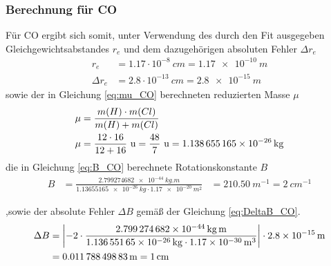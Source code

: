 \subsubsection*{Berechnung für CO}
Für CO ergibt sich somit, unter Verwendung des durch den Fit ausgegeben Gleichgewichtsabstandes $r_e$ und dem dazugehörigen absoluten Fehler $\Delta r_e$
\begin{align}
\label{eq:r_CO}
r_e &= 1.17 \cdot 10^{-8} ~\si{cm}=\SI[mode=math]{1.17e-10}{m}
\\
\Delta r_e &= 2.8 \cdot 10^{-13} ~\si{cm}=\SI[mode=math]{2.8e-15}{m}
\end{align}
 sowie der in Gleichung \ref{eq:mu_CO} berechneten reduzierten Masse $\mu$
\begin{align}
\mu&= \frac{m(H)\cdot m(Cl)}{m(H)+m(Cl)}\notag\\
\mu&= \frac{12\cdot16}{12+16} ~\si{u}=\frac{48}{7}~\si{u}=\SI[mode=math]{1.138655165e-26}{kg}\label{eq:mu_CO}
\end{align}
die in Gleichung \ref{eq:B_CO} berechnete Rotationskonstante $B$
\begin{align}
\label{eq:B_CO}
B &=\frac{\SI[mode=math]{2.799274682e-44}{kg.m}}{\SI[mode=math]{1.13655165e-26}{kg}\cdot\SI[mode=math]{1.17e-20}{m^{2}}}
&=\SI[mode=math]{210.50}{m^{-1}}
=\SI[mode=math]{2}{cm^{-1}}
\end{align}


,sowie der absolute Fehler $\Delta B$ gemäß der  Gleichung \ref{eq:DeltaB_CO}.  
\begin{align}
\Delta B &= \left|-2\cdot \frac{\SI[mode=math]{2.799274682e-44}{kg.m}}{\SI[mode=math]{1.13655165e-26}{kg}\cdot\SI[mode=math]{1.17e-30}{m^{3}}}\right| \cdot \SI[mode=math]{2.8e-15}{m}
\notag\\
&=\SI[mode=math]{0.01178849883 }{m} = \SI[mode=math]{1}{cm}   \label{eq:DeltaB_CO}
\end{align} 









 




